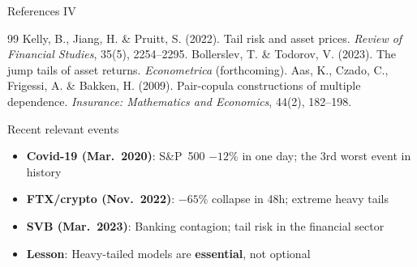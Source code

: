 \documentclass[9pt, aspectratio=169, t]{beamer}
\theoremstyle{definition}
\begin{document}
\begin{frame}{References IV}
\small
\begin{thebibliography}{99}
 Kelly, B., Jiang, H. \& Pruitt, S. (2022). Tail risk and asset prices. \textit{Review of Financial Studies}, 35(5), 2254--2295.
 Bollerslev, T. \& Todorov, V. (2023). The jump tails of asset returns. \textit{Econometrica} (forthcoming).
 Aas, K., Czado, C., Frigessi, A. \& Bakken, H. (2009). Pair-copula constructions of multiple dependence. \textit{Insurance: Mathematics and Economics}, 44(2), 182--198.
\end{thebibliography}

\vspace{0.3cm}
\begin{exampleblock}{Recent relevant events}
{\small
\begin{itemize}\setlength{\itemsep}{0pt}
    \item \textbf{Covid-19 (Mar.\ 2020)}: S\&P~500 $-12\%$ in one day; the 3rd worst event in history
    \item \textbf{FTX/crypto (Nov.\ 2022)}: $-65\%$ collapse in 48h; extreme heavy tails
    \item \textbf{SVB (Mar.\ 2023)}: Banking contagion; tail risk in the financial sector
    \item \textbf{Lesson}: Heavy-tailed models are \textbf{essential}, not optional
\end{itemize}
}
\end{exampleblock}
\end{frame}
\end{document}
